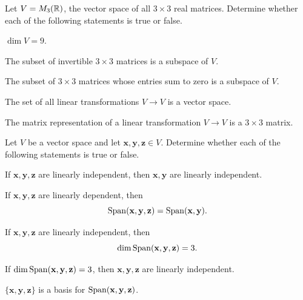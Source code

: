 \documentclass[11pt,oneside]{article}
\begin{document}
\begin{problem}
Let $V=M_3(\mathbb{R})$, the vector space of all $3\times3$ real matrices. Determine whether each of the following statements is true or false.
\begin{problemchoices}
\item $\dim V=9$.
\item The subset of invertible $3\times3$ matrices is a subspace of $V$.
\item The subset of $3\times3$ matrices whose entries sum to zero is a subspace of $V$.
\item The set of all linear transformations $V\to V$ is a vector space.
\item The matrix representation of a linear transformation $V\to V$ is a $3\times3$ matrix.
\end{problemchoices}
\end{problem}

\begin{problem}
Let $V$ be a vector space and let $\mathbf x,\mathbf y,\mathbf z\in V$. Determine whether each of the following statements is true or false.
\begin{problemchoices}
\item If $\mathbf x,\mathbf y,\mathbf z$ are linearly independent, then $\mathbf x,\mathbf y$ are linearly independent.
\item If $\mathbf x,\mathbf y,\mathbf z$ are linearly dependent, then
\[
\operatorname{Span}(\mathbf x,\mathbf y,\mathbf z)=\operatorname{Span}(\mathbf x,\mathbf y).
\]
\item If $\mathbf x,\mathbf y,\mathbf z$ are linearly independent, then
\[
\dim\operatorname{Span}(\mathbf x,\mathbf y,\mathbf z)=3.
\]
\item If $\dim\operatorname{Span}(\mathbf x,\mathbf y,\mathbf z)=3$, then $\mathbf x,\mathbf y,\mathbf z$ are linearly independent.
\item $\{\mathbf x,\mathbf y,\mathbf z\}$ is a basis for $\operatorname{Span}(\mathbf x,\mathbf y,\mathbf z)$.
\end{problemchoices}
\end{problem}
\end{document}
